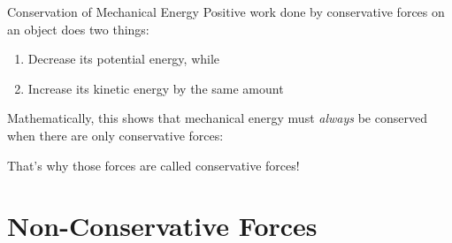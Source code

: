 \documentclass[12pt,compress,aspectratio=169]{beamer}
\begin{document}
%



\begin{frame}{Conservation of Mechanical Energy}
  Positive work done by conservative forces on an object does two things:
  \begin{enumerate}[1.]
  \item Decrease its potential energy, while
  \item Increase its kinetic energy by the same amount
  \end{enumerate}
  Mathematically, this shows that mechanical energy must \emph{always} be
  conserved when there are only conservative forces:


  That's why those forces are called conservative forces!
\end{frame}


\section{Non-Conservative Forces}
\end{document}
